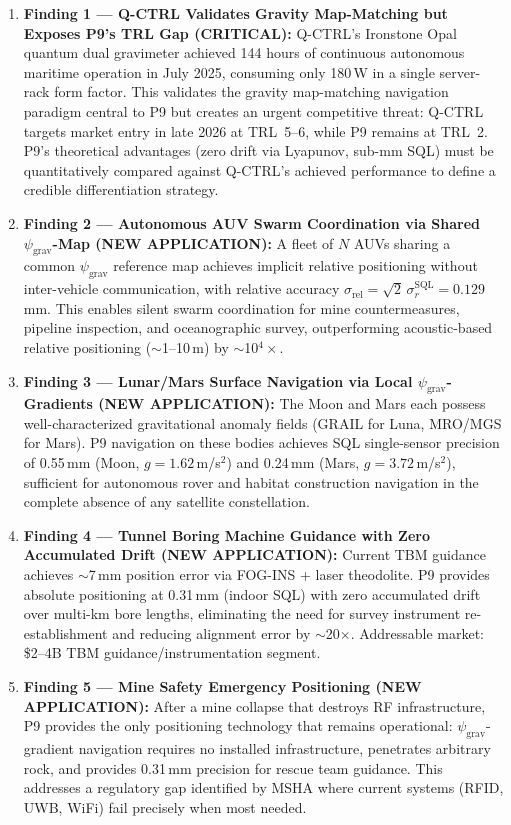 \documentclass[11pt]{article}
\theoremstyle{definition}
\theoremstyle{remark}
\newcommand{\psigrav}{\psi_{\mathrm{grav}}}
\newcommand{\SQL}{\mathrm{SQL}}
\begin{document}
\begin{enumerate}
\item \textbf{Finding 1 --- Q-CTRL Validates Gravity Map-Matching but Exposes
  P9's TRL Gap (CRITICAL):} Q-CTRL's Ironstone Opal quantum dual gravimeter
  achieved 144 hours of continuous autonomous maritime operation in July 2025,
  consuming only 180\,W in a single server-rack form factor. This validates
  the gravity map-matching navigation paradigm central to P9 but creates an
  urgent competitive threat: Q-CTRL targets market entry in late 2026 at
  TRL~5--6, while P9 remains at TRL~2. P9's theoretical advantages (zero
  drift via Lyapunov, sub-mm SQL) must be quantitatively compared against
  Q-CTRL's achieved performance to define a credible differentiation strategy.

\item \textbf{Finding 2 --- Autonomous AUV Swarm Coordination via Shared
  $\psigrav$-Map (NEW APPLICATION):} A fleet of $N$ AUVs sharing a common
  $\psigrav$ reference map achieves implicit relative positioning without
  inter-vehicle communication, with relative accuracy
  $\sigma_{\mathrm{rel}} = \sqrt{2}\,\sigma_r^{\SQL} = 0.129$\,mm. This
  enables silent swarm coordination for mine countermeasures, pipeline
  inspection, and oceanographic survey, outperforming acoustic-based
  relative positioning ($\sim$1--10\,m) by $\sim$10$^4\times$.

\item \textbf{Finding 3 --- Lunar/Mars Surface Navigation via Local
  $\psigrav$-Gradients (NEW APPLICATION):} The Moon and Mars each possess
  well-characterized gravitational anomaly fields (GRAIL for Luna, MRO/MGS
  for Mars). P9 navigation on these bodies achieves SQL single-sensor
  precision of 0.55\,mm (Moon, $g = 1.62$\,m/s$^2$) and 0.24\,mm
  (Mars, $g = 3.72$\,m/s$^2$), sufficient for autonomous rover and habitat
  construction navigation in the complete absence of any satellite
  constellation.

\item \textbf{Finding 4 --- Tunnel Boring Machine Guidance with Zero
  Accumulated Drift (NEW APPLICATION):} Current TBM guidance achieves
  $\sim$7\,mm position error via FOG-INS + laser theodolite. P9 provides
  absolute positioning at 0.31\,mm (indoor SQL) with zero accumulated
  drift over multi-km bore lengths, eliminating the need for survey
  instrument re-establishment and reducing alignment error by $\sim$20$\times$.
  Addressable market: \$2--4B TBM guidance/instrumentation segment.

\item \textbf{Finding 5 --- Mine Safety Emergency Positioning (NEW
  APPLICATION):} After a mine collapse that destroys RF infrastructure,
  P9 provides the only positioning technology that remains operational:
  $\psigrav$-gradient navigation requires no installed infrastructure,
  penetrates arbitrary rock, and provides 0.31\,mm precision for
  rescue team guidance. This addresses a regulatory gap identified by
  MSHA where current systems (RFID, UWB, WiFi) fail precisely when
  most needed.
\end{enumerate}
\end{document}
